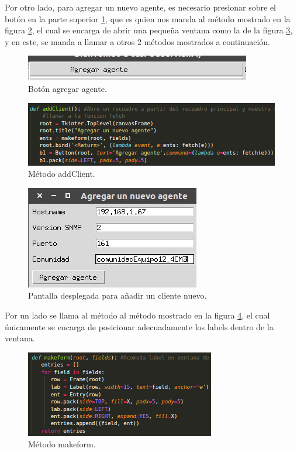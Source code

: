 Por otro lado, para agregar un nuevo agente, es necesario presionar sobre el botón en la parte superior \ref{image:agregar}, que es quien nos manda al método mostrado en la figura \ref{image:add1}, el cual se encarga de abrir una pequeña ventana como la de la figura \ref{image:addP}, y en este, se manda a llamar a otros 2 métodos mostrados a continuación.
\FloatBarrier
\begin{figure}[htbp!]
		\centering
	\includegraphics[width=.4 \textwidth]{images/agregar}
		\caption{Botón agregar agente.}		\label{image:agregar}
\end{figure}
\FloatBarrier

\FloatBarrier
\begin{figure}[htbp!]
		\centering
	\includegraphics[width=.8 \textwidth]{images/add1}
		\caption{Método addClient.}		\label{image:add1}
\end{figure}
\FloatBarrier

\FloatBarrier
\begin{figure}[htbp!]
		\centering
	\includegraphics[width=.4 \textwidth]{images/addP}
		\caption{Pantalla desplegada para añadir un cliente nuevo.}		\label{image:addP}
\end{figure}
\FloatBarrier

Por un lado se llama al método al método mostrado en la figura \ref{image:add2}, el cual únicamente se encarga de posicionar adecuadamente los labels dentro de la ventana.
\FloatBarrier
\begin{figure}[htbp!]
		\centering
	\includegraphics[width=.5 \textwidth]{images/add2}
		\caption{Método makeform.}		\label{image:add2}
\end{figure}
\FloatBarrier

